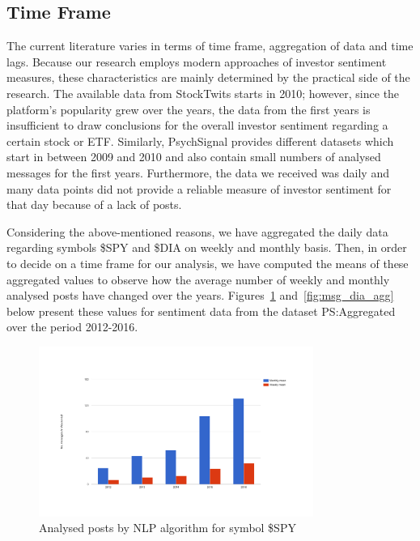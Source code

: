 \subsection{Time Frame} \label{timeframe}
The current literature varies in terms of time frame, aggregation of data and time lags. Because our research employs modern approaches of investor sentiment measures, these characteristics are mainly determined by the practical side of the research. The available data from StockTwits starts in 2010; however, since the platform's popularity grew over the years, the data from the first years is insufficient to draw conclusions for the overall investor sentiment regarding a certain stock or ETF. Similarly, PsychSignal provides different datasets which start in between 2009 and 2010 and also contain small numbers of analysed messages for the first years. Furthermore, the data we received was daily and many data points did not provide a reliable measure of investor sentiment for that day because of a lack of posts.
\par
Considering the above-mentioned reasons, we have aggregated the daily data regarding symbols \$SPY and \$DIA on weekly and monthly basis. Then, in order to decide on a time frame for our analysis, we have computed the means of these aggregated values to observe how the average number of weekly and monthly analysed posts have changed over the years. Figures~\ref{fig:msg_spy_agg} and~\ref{fig:msg_dia_agg} below present these values for sentiment data from the dataset PS:Aggregated over the period 2012-2016.

\begin{figure}[ht]
\centering
\caption{\label{fig:msg_spy_agg}Analysed posts by NLP algorithm for symbol \$SPY}
\includegraphics[width=0.8\textwidth]{figures/msg_spy_agg.png}
\end{figure}

